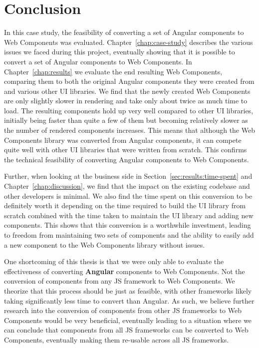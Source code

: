 \chapter{Conclusion}\label{chap:conclusion}

In this case study, the feasibility of converting a set of Angular components to Web Components was evaluated. Chapter~\ref{chap:case-study} describes the various issues we faced during this project, eventually showing that it is possible to convert a set of Angular components to Web Components. In Chapter~\ref{chap:results} we evaluate the end resulting Web Components, comparing them to both the original Angular components they were created from and various other UI libraries. We find that the newly created Web Components are only slightly slower in rendering and take only about twice as much time to load. The resulting components hold up very well compared to other UI libraries, initially being faster than quite a few of them but becoming relatively slower as the number of rendered components increases. This means that although the Web Components library was converted from Angular components, it can compete quite well with other UI libraries that were written from scratch. This confirms the technical feasibility of converting Angular components to Web Components.

Further, when looking at the business side in Section~\ref{sec:results:time-spent} and Chapter~\ref{chap:discussion}, we find that the impact on the existing codebase and other developers is minimal. We also find the time spent on this conversion to be definitely worth it depending on the time required to build the UI library from scratch combined with the time taken to maintain the UI library and adding new components. This shows that this conversion is a worthwhile investment, leading to freedom from maintaining two sets of components and the ability to easily add a new component to the Web Components library without issues.

One shortcoming of this thesis is that we were only able to evaluate the effectiveness of converting \textbf{Angular} components to Web Components. Not the conversion of components from any JS framework to Web Components. We theorize that this process should be just as feasible, with other frameworks likely taking significantly less time to convert than Angular. As such, we believe further research into the conversion of components from other JS frameworks to Web Components would be very beneficial, eventually leading to a situation where we can conclude that components from all JS frameworks can be converted to Web Components, eventually making them re-usable across all JS frameworks.